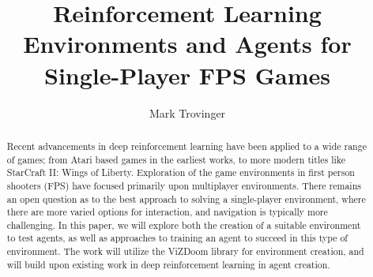 \documentclass[11pt]{article}
\title{Reinforcement Learning Environments and Agents for Single-Player FPS Games}
\author{Mark Trovinger}
\begin{document}
	\maketitle
\begin{abstract}
	Recent advancements in deep reinforcement learning have been applied to a wide range of games; from Atari based games in the earliest works, to more modern titles like StarCraft II: Wings of Liberty. Exploration of the game environments in first person shooters (FPS) have focused primarily upon multiplayer environments. There remains an open question as to the best approach to solving a single-player environment, where there are more varied options for interaction, and navigation is typically more challenging. In this paper, we will explore both the creation of a suitable environment to test agents, as well as approaches to training an agent to succeed in this type of environment. The work will utilize the ViZDoom library for environment creation, and will build upon existing work in deep reinforcement learning in agent creation. 
\end{abstract}
\end{document}
